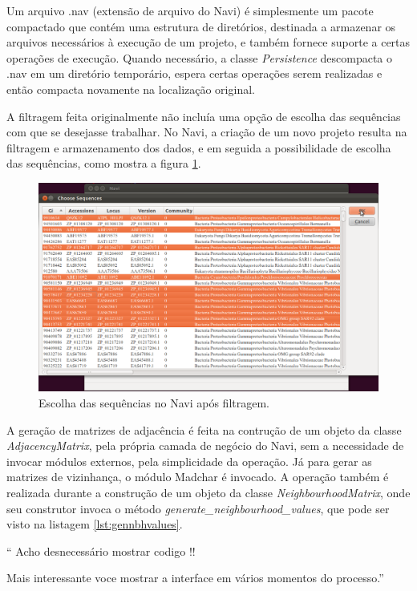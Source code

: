 Um arquivo .nav (extensão de arquivo do Navi) é simplesmente um pacote compactado que contém uma estrutura de diretórios, destinada a armazenar os arquivos
necessários à execução de um projeto, e também fornece suporte a certas operações de execução. Quando necessário, a classe \textit{Persistence} descompacta
o .nav em um diretório temporário, espera certas operações serem realizadas e então compacta novamente na localização original.

A filtragem feita originalmente não incluía uma opção de escolha das sequências com que se desejasse trabalhar. No Navi, a criação de um novo projeto resulta
na filtragem e armazenamento dos dados, e em seguida a possibilidade de escolha das sequências, como mostra a figura \ref{fig:choose-sequences}.

\begin{figure}
\centering
\includegraphics[scale=0.38]{choose-sequences}
\caption{Escolha das sequências no Navi após filtragem.}
\label{fig:choose-sequences}
\end{figure}

A geração de matrizes de adjacência é feita na contrução de um objeto da classe \textit{AdjacencyMatrix}, pela própria camada de negócio do Navi, sem a
necessidade de invocar módulos externos, pela simplicidade da operação. Já para gerar as matrizes de vizinhança, o módulo Madchar é invocado. A operação
também é realizada durante a construção de um objeto da classe \textit{NeighbourhoodMatrix}, onde seu construtor invoca o método
\textit{generate\_neighbourhood\_values}, que pode ser visto na listagem \ref{lst:gennbhvalues}.

``
Acho desnecessário mostrar codigo !!

Mais interessante voce mostrar a interface em vários momentos do processo.''

